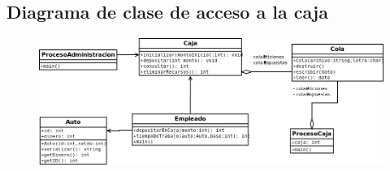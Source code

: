 \documentclass[12pt,a4paper,spanish]{article}
\begin{document}
	\newpage
	\subsection{Diagrama de clase de acceso a la caja}

	\begin{figure}[h]
	\includegraphics[angle=90,scale=0.56]{AccesoCaja2.png}
	\centering
	\end{figure}
\end{document}
